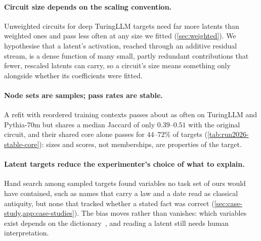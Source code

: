 \documentclass[10pt]{article}
\begin{document}
\paragraph{Circuit size depends on the scaling convention.}
Unweighted circuits for deep TuringLLM targets need far more latents than weighted ones and pass less often at any size we fitted (\cref{sec:weighted}).
We hypothesise that a latent's activation, reached through an additive residual stream, is a dense function of many small, partly redundant contributions that fewer, rescaled latents can carry, so a circuit's size means something only alongside whether its coefficients were fitted.

\paragraph{Node sets are samples; pass rates are stable.}
A refit with reordered training contexts passes about as often on TuringLLM and Pythia-70m but shares a median Jaccard of only $0.39$--$0.51$ with the original circuit, and their shared core alone passes for $44$--$72\%$ of targets (\cref{tab:run2026-stable-core}): sizes and scores, not memberships, are properties of the target.

\paragraph{Latent targets reduce the experimenter's choice of what to explain.}
Hand search among sampled targets found variables no task set of ours would have contained, such as names that carry a law and a date read as classical antiquity, but none that tracked whether a stated fact was correct (\cref{sec:case-study,app:case-studies}).
The bias moves rather than vanishes: which variables exist depends on the dictionary~\citep{leask2025canonical}, and reading a latent still needs human interpretation.
\end{document}
